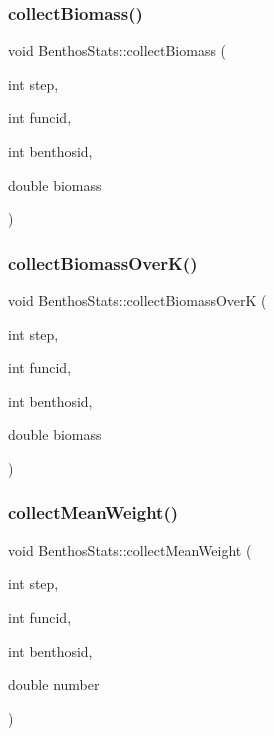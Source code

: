 \mbox{\label{class_benthos_stats_a05005c7a2b7566175dc0b9004a0fbedd}} 
\subsubsection{\texorpdfstring{collectBiomass()}{collectBiomass()}}
{\footnotesize\ttfamily void Benthos\+Stats\+::collect\+Biomass (\begin{DoxyParamCaption}\item[{int}]{step,  }\item[{int}]{funcid,  }\item[{int}]{benthosid,  }\item[{double}]{biomass }\end{DoxyParamCaption})}

\mbox{\label{class_benthos_stats_a370a3d1729f3eaa15f4c491df15479e6}} 
\subsubsection{\texorpdfstring{collectBiomassOverK()}{collectBiomassOverK()}}
{\footnotesize\ttfamily void Benthos\+Stats\+::collect\+Biomass\+OverK (\begin{DoxyParamCaption}\item[{int}]{step,  }\item[{int}]{funcid,  }\item[{int}]{benthosid,  }\item[{double}]{biomass }\end{DoxyParamCaption})}

\mbox{\label{class_benthos_stats_a9497fe6d6e3ef99a32803fc4c27ba15f}} 
\subsubsection{\texorpdfstring{collectMeanWeight()}{collectMeanWeight()}}
{\footnotesize\ttfamily void Benthos\+Stats\+::collect\+Mean\+Weight (\begin{DoxyParamCaption}\item[{int}]{step,  }\item[{int}]{funcid,  }\item[{int}]{benthosid,  }\item[{double}]{number }\end{DoxyParamCaption})}

